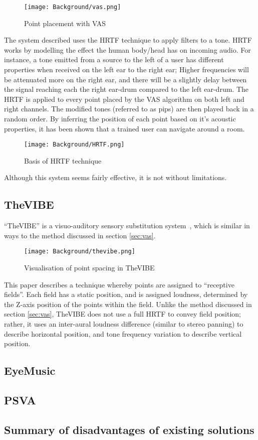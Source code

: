 \begin{figure}[H]
    \centering
    \texttt{[image: Background/vas.png]}
    \caption{Point placement with \ac{VAS}}
\end{figure}

The system described uses the \ac{HRTF} technique to apply filters to a tone. \ac{HRTF} works by modelling the effect the human body/head has on incoming audio. For instance, a tone emitted from a source to the left of a user has different properties when received on the left ear to the right ear; Higher frequencies will be attenuated more on the right ear, and there will be a slightly delay between the signal reaching each the right ear-drum compared to the left ear-drum. The \ac{HRTF} is applied to every point placed by the \ac{VAS} algorithm on both left and right channels. The modified tones (referred to as pips) are then played back in a random order. By inferring the position of each point based on it's acoustic properties, it has been shown that a trained user can navigate around a room.

\begin{figure}[H]
    \centering
    \texttt{[image: Background/HRTF.png]}
    \caption{Basis of HRTF technique~\cite{hrtf-diagram}}
\end{figure}

Although this system seems fairly effective, it is not without limitations.  

\subsection{TheVIBE}
``TheVIBE'' is a visuo-auditory sensory substitution system~\cite{thevibe}, which is similar in ways to the method discussed in section \ref{sec:vas}.

\begin{figure}[H]
    \centering
    \texttt{[image: Background/thevibe.png]}
    \caption{Visualisation of point spacing in TheVIBE}
\end{figure}

This paper describes a technique whereby points are assigned to ``receptive fields''. Each field has a static position, and is assigned loudness, determined by the Z-axis position of the points within the field. Unlike the method discussed in section \ref{sec:vas}, TheVIBE does not use a full \ac{HRTF} to convey field position; rather, it uses an inter-aural loudness difference (similar to stereo panning) to describe horizontal position, and tone frequency variation to describe vertical position.

\subsection{EyeMusic}
\subsection{PSVA}

\subsection{Summary of disadvantages of existing solutions}
